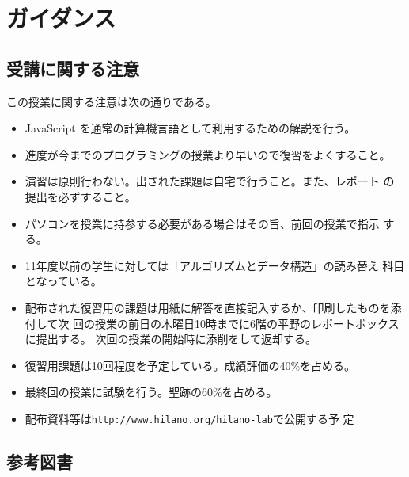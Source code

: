 
\Textfalse
\renewcommand{\postchaptername}{回}
\newcommand{\Ans}[1]{}


\frontmatter
\maketitle
\tableofcontents
\mainmatter
\chapter{ガイダンス}
\section{受講に関する注意}
この授業に関する注意は次の通りである。
\begin{itemize}
 \item JavaScript を通常の計算機言語として利用するための解説を行う。
 \item 進度が今までのプログラミングの授業より早いので復習をよくすること。
 \item 演習は原則行わない。出された課題は自宅で行うこと。また、レポート
       の提出を必ずすること。
 \item パソコンを授業に持参する必要がある場合はその旨、前回の授業で指示
       する。
 \item 11年度以前の学生に対しては「アルゴリズムとデータ構造」の読み替え
       科目となっている。
  \item 配布された復習用の課題は用紙に解答を直接記入するか、印刷したものを添付して次
        回の授業の前日の木曜日10時までに6階の平野のレポートボックスに提出する。
        次回の授業の開始時に添削をして返却する。
 \item 復習用課題は10回程度を予定している。成績評価の40\%を占める。
\item 最終回の授業に試験を行う。聖跡の60\%を占める。
 \item 配布資料等は\texttt{http://www.hilano.org/hilano-lab}で公開する予
       定
\end{itemize}
\section{参考図書}

